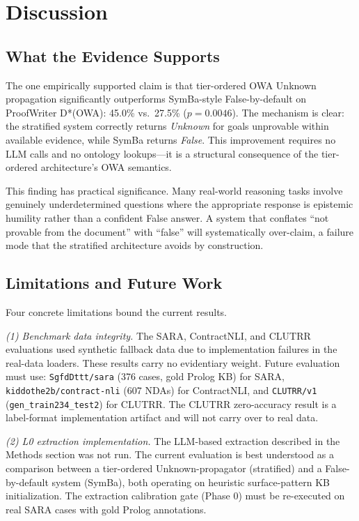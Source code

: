 \documentclass[11pt,letterpaper]{article}
\begin{document}
\section{Discussion}
\label{sec:discussion}

\subsection{What the Evidence Supports}

The one empirically supported claim is that tier-ordered OWA Unknown propagation significantly outperforms SymBa-style False-by-default on ProofWriter D*(OWA):
45.0\% vs.\ 27.5\% ($p = 0.0046$). The mechanism is clear: the stratified system correctly returns \emph{Unknown} for goals unprovable
within available evidence, while SymBa returns \emph{False}. This improvement requires no LLM calls and no ontology lookups---it
is a structural consequence of the tier-ordered architecture's OWA semantics.

This finding has practical significance.
Many real-world reasoning tasks involve genuinely underdetermined questions where the appropriate response is epistemic
humility rather than a confident False answer. A system that conflates ``not provable from the document'' with ``false''
will systematically over-claim, a failure mode that the stratified architecture avoids by construction.

\subsection{Limitations and Future Work}

Four concrete limitations bound the current results.

\textit{(1) Benchmark data integrity.} The SARA, ContractNLI, and CLUTRR evaluations used synthetic fallback data due to implementation failures in the real-data loaders. These results
carry no evidentiary weight. Future evaluation must use: \texttt{SgfdDttt/sara} (376 cases, gold Prolog KB) for SARA, \texttt{kiddothe2b/contract-nli}
(607 NDAs) for ContractNLI, and \texttt{CLUTRR/v1} (\texttt{gen\_train234\_test2}) for CLUTRR. The CLUTRR zero-accuracy result is a
label-format implementation artifact and will not carry over to real data.

\textit{(2) L0 extraction implementation.} The LLM-based extraction described in the Methods section was not run. The current evaluation is best understood as a comparison
between a tier-ordered Unknown-propagator (stratified) and a False-by-default system (SymBa), both operating on heuristic
surface-pattern KB initialization. The extraction calibration gate (Phase 0) must be re-executed on real SARA cases with
gold Prolog annotations.
\end{document}
